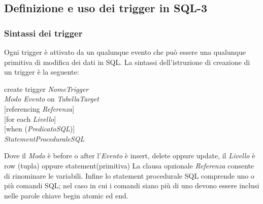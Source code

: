 \subsection{Definizione e uso dei trigger in SQL-3}
\subsubsection{Sintassi dei trigger}
Ogni trigger è attivato da un qualunque evento che può essere una qualunque primitiva di modifica dei dati in SQL. La sintassi dell'istruzione di creazione di un trigger è la seguente:
\begin{flushleft}
\hspace{4cm}\textsf{create trigger} \emph{NomeTrigger}\\
\hspace{4cm}\hspace{0,5cm}\emph{Modo Evento} \textsf{on} \emph{TabellaTarget}\\
\hspace{4cm}\hspace{0,5cm}[\textsf{referencing} \emph{Referenza}]\\
\hspace{4cm}\hspace{0,5cm}[\textsf{for each} \emph{Livello}]\\
\hspace{4cm}\hspace{0,5cm}[\textsf{when} (\emph{PredicatoSQL})]\\
\hspace{4cm}\hspace{0,5cm}\emph{StatementProceduraleSQL}\\
\end{flushleft}
Dove il \emph{Modo} è \textsf{before} o \textsf{after} l'\emph{Evento} è \textsf{insert, delete} oppure \textsf{update}, il \emph{Livello} è \textsf{row} (tupla) oppure \textsf{statement}(primitiva) La clausa opzionale \emph{Referenza} consente di rinominare le variabili. Infine lo statement procedurale SQL comprende uno o più comandi SQL; nel caso in cui i comandi siano più di uno devono essere inclusi nelle parole chiave \textsf{begin atomic} ed \textsf{end}.
